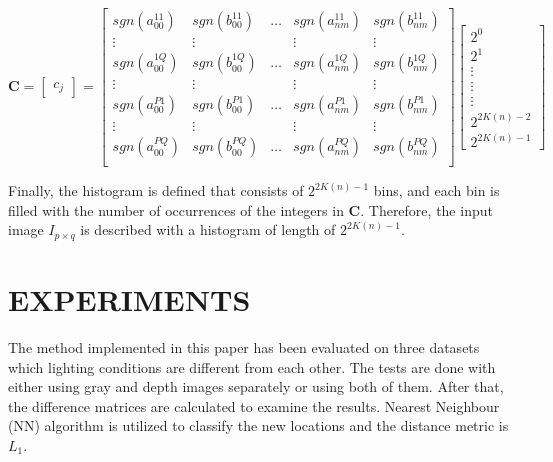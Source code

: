 \documentclass[]{spie}  %
\begin{document}
\begin{equation}
\mathbf{C} = 
\begin{bmatrix}
c_{j}
\end{bmatrix}=
  \begin{bmatrix}
sgn(a_{00}^{11}) & sgn(b_{00}^{11}) & \hdots & sgn(a_{nm}^{11}) & sgn(b_{nm}^{11}) \\
  \vdots  & \vdots & & \vdots  & \vdots\\
sgn(a_{00}^{1Q}) & sgn(b_{00}^{1Q}) & \hdots & sgn(a_{nm}^{1Q}) & sgn(b_{nm}^{1Q}) \\
  \vdots  & \vdots & & \vdots  & \vdots\\
sgn(a_{00}^{P1}) & sgn(b_{00}^{P1}) & \hdots & sgn(a_{nm}^{P1}) & sgn(b_{nm}^{P1}) \\
  \vdots  & \vdots & & \vdots  & \vdots\\
sgn(a_{00}^{PQ}) &sgn(b_{00}^{PQ}) & \hdots & sgn(a_{nm}^{PQ}) & sgn(b_{nm}^{PQ}) \\
 \end{bmatrix}
 \begin{bmatrix}
2^0 \\
2^1 \\
 \vdots \\
 \vdots \\
 \vdots \\
 2^{2 K(n)-2} \\
 2^{2 K(n)-1}
 \end{bmatrix}
 \label{eq:lzm_coded}
\end{equation}

Finally, the histogram is defined that consists of $2^{2K(n)-1}$ bins, and each bin is filled with the number of occurrences of the integers in $\mathbf{C}$. Therefore, the input image $I_{p\times q}$ is described with a histogram of length of $2^{2K(n)-1}$.


\section{EXPERIMENTS}

The method implemented in this paper has been evaluated on three datasets which lighting conditions are different from each other. The tests are done with either using gray and depth images separately or using both of them. After that, the difference matrices are calculated to examine the results. Nearest Neighbour (NN) algorithm is utilized to classify the new locations and the distance metric is $L_{1}$.
\end{document}
